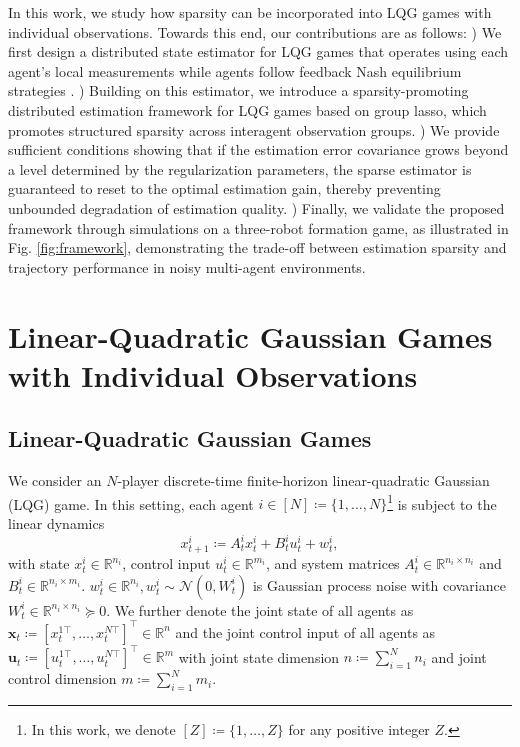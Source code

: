\documentclass[letterpaper, 10 pt, conference]{ieeeconf}  %
\begin{document}
In this work, we study how sparsity can be incorporated into LQG games with individual observations. Towards this end, our contributions are as follows: 
) We first design a distributed state estimator for LQG games that operates using each agent's local measurements while agents follow feedback Nash equilibrium strategies \cite{SmoothGameTheory, liu2024policies}. 
) Building on this estimator, we introduce a sparsity-promoting distributed estimation framework for LQG games based on group lasso, which promotes structured sparsity across interagent observation groups. 
) We provide sufficient conditions showing that if the estimation error covariance grows beyond a level determined by the regularization parameters, the sparse estimator is guaranteed to reset to the optimal estimation gain, thereby preventing unbounded degradation of estimation quality.
) Finally, we validate the proposed framework through simulations on a three-robot formation game, as illustrated in Fig. \ref{fig:framework}, demonstrating the trade-off between estimation sparsity and trajectory performance in noisy multi-agent environments.



% 

\section{Linear-Quadratic Gaussian Games with Individual Observations}
\label{sec:lqgg_ie}
\subsection{Linear-Quadratic Gaussian Games}
We consider an $N$-player discrete-time finite-horizon linear-quadratic Gaussian (LQG) game.  In this setting, each agent ${i\in[N]\coloneqq\{1,\dots,N\}}$\footnote{In this work, we denote $[Z]\coloneqq\{1,\dots,Z\}$ for any positive integer $Z$.} is subject to the linear dynamics
\begin{equation*}
        x_{t+1}^i\coloneqq A_t^ix_t^i+B_t^iu_t^i+w_t^i,
\end{equation*}
with state ${x_t^i\in\mathbb{R}^{n_i}}$, control input ${u_t^i\in\mathbb{R}^{m_i}}$, and system matrices ${A_t^i\in\mathbb{R}^{n_i\times n_i}}$ and ${B_t^i\in\mathbb{R}^{n_i\times m_i}}$. ${w_t^i\in\mathbb{R}^{n_i},w_t^i\sim\mathcal{N}(0,W_t^i)}$ is Gaussian process noise with covariance $W_t^i\in\mathbb{R}^{n_i\times n_i}\succeq0$. We further denote the joint state of all agents as ${\textbf{x}_t\coloneqq[x_t^{1\top},\dots,x_t^{N\top}]^\top\in\mathbb{R}^n}$ and the joint control input of all agents as ${\textbf{u}_t\coloneqq[u_t^{1\top},\dots,u_t^{N\top}]^\top\in\mathbb{R}^m}$ with joint state dimension ${n\coloneqq\sum_{i=1}^Nn_i}$ and joint control dimension ${m\coloneqq\sum_{i=1}^Nm_i}$.
\end{document}
